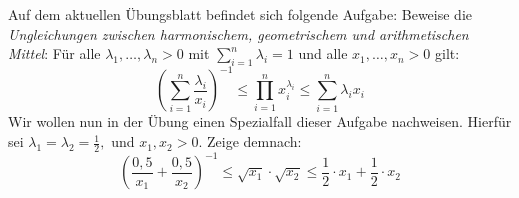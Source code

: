 \begin{exercise} %
  Auf dem aktuellen Übungsblatt befindet sich folgende Aufgabe: Beweise die
  \emph{Ungleichungen zwischen harmonischem, geometrischem und arithmetischen
    Mittel}: Für alle $\lambda_1, \ldots, \lambda_n > 0$ mit
  $\sum_{i=1}^n \lambda_i = 1$ und alle $x_1, \ldots, x_n > 0$ gilt:
  \begin{equation*}
    \left( \sum_{i = 1}^n \frac{\lambda_i}{x_i} \right)^{-1}
    \leq
    \prod_{i = 1}^n x_i^{\lambda_i}
    \leq
    \sum_{i = 1}^n \lambda_i x_i
  \end{equation*}
  Wir wollen nun in der Übung einen Spezialfall dieser Aufgabe nachweisen.
  Hierfür sei $\lambda_1 = \lambda_2 = \frac{1}{2},$ und $x_1, x_2>0.$ Zeige
  demnach:
  \begin{equation*}
    \left(\frac{0,5}{x_1} + \frac{0,5}{x_2}\right)^{-1}
    \leq
    \sqrt{x_1} \cdot \sqrt{x_2}
    \leq
    \frac{1}{2} \cdot x_1 + \frac{1}{2} \cdot x_2
  \end{equation*}
\end{exercise}
